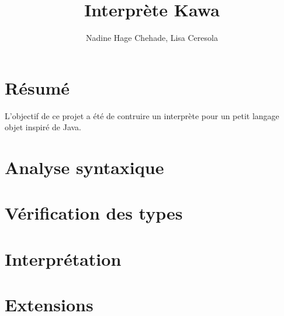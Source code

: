 \documentclass{article}
\title{{\myfont Interprète Kawa}}
\author{Nadine Hage Chehade, Lisa Ceresola}
\date{}
\begin{document}
\maketitle
\tableofcontents
\newpage
\section{Résumé}
L'objectif de ce projet a été de contruire un interprète pour un petit langage objet inspiré de Java.
\section{Analyse syntaxique}
\section{Vérification des types}
\section{Interprétation}
\section{Extensions}
\end{document}
